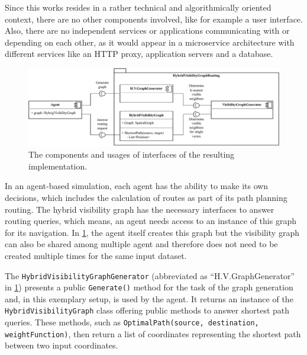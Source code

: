 	Since this works resides in a rather technical and algorithmically oriented context, there are no other components involved, like for example a user interface.
	Also, there are no independent services or applications communicating with or depending on each other, as it would appear in a microservice architecture with different services like an HTTP proxy, application servers and a database.
	
	\begin{figure}[h]
		\begin{figcenter}
			\includegraphics[width=\textwidth]{images/components.pdf}
		\end{figcenter}
		\caption{The components and usages of interfaces of the resulting implementation.}
		\label{fig:components}
	\end{figure}
	
	In an agent-based simulation, each agent has the ability to make its own decisions, which includes the calculation of routes as part of its path planning routing.
	The hybrid visibility graph has the necessary interfaces to answer routing queries, which means, an agent needs access to an instance of this graph for its navigation.
	In \cref{fig:components}, the agent itself creates this graph but the visibility graph can also be shared among multiple agent and therefore does not need to be created multiple times for the same input dataset.
	
	The \texttt{HybridVisibilityGraphGenerator} (abbreviated as \enquote{H.V.GraphGenerator} in \cref{fig:components}) presents a public \texttt{Generate()} method for the task of the graph generation and, in this exemplary setup, is used by the agent.
	It returns an instance of the \texttt{HybridVisibilityGraph} class offering public methods to answer shortest path queries.
	These methods, such as \texttt{OptimalPath(source, destination, weightFunction)}, then return a list of coordinates representing the shortest path between two input coordinates.
	
